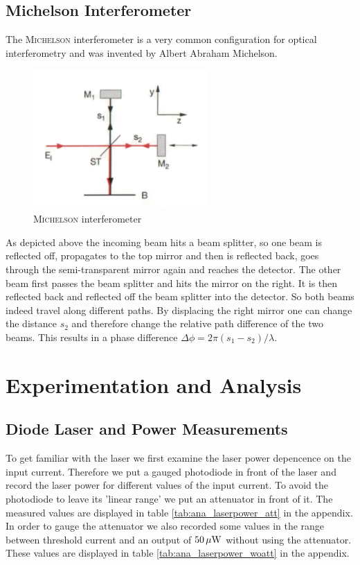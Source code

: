 \documentclass{protokoll_en}
\begin{document}
\subsection{Michelson Interferometer}
The \textsc{Michelson} interferometer is a very common configuration for optical interferometry and was invented by Albert Abraham Michelson. 
\begin{figure}[H]
	\centering
		\includegraphics[width=0.6\textwidth]{graphics/michelson}
	\caption{\textsc{Michelson} interferometer~\cite{demtroed2}}
	\label{fig:michelson}
\end{figure}
As depicted above the incoming beam hits a beam splitter, so one beam is reflected off, propagates to the top mirror and then is reflected back, goes through the semi-transparent mirror again and reaches the detector. The other beam first passes the beam splitter and hits the mirror on the right. It is then reflected back and reflected off the beam splitter into the detector. So both beams indeed travel along different paths. By displacing the right mirror one can change the distance $s_2$ and therefore change the relative path difference of the two beams. This results in a phase difference $\Delta \phi = 2\pi (s_1-s_2)/\lambda$.

\section{Experimentation and Analysis}
\subsection{Diode Laser and Power Measurements}
\label{ana_laserpower}
To get familiar with the laser we first examine the laser power depencence on the input current. Therefore we put a gauged photodiode in front of the laser and record the laser power for different values of the input current. To avoid the photodiode to leave its 'linear range' we put an attenuator in front of it. The measured values are displayed in table \ref{tab:ana_laserpower_att} in the appendix. In order to gauge the attenuator we also recorded some values in the range between threshold current and an output of $\unit[50]{\mu W}$ without using the attenuator. These values are displayed in table \ref{tab:ana_laserpower_woatt} in the appendix.
\end{document}
